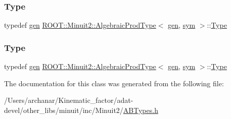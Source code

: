 \mbox{\label{classROOT_1_1Minuit2_1_1AlgebraicProdType_3_01gen_00_01sym_01_4_acdbf9062d11987f3a1cb857a95ef2669}} 
\subsubsection{\texorpdfstring{Type}{Type}\hspace{0.1cm}{\footnotesize\ttfamily [2/3]}}
{\footnotesize\ttfamily typedef \mbox{\hyperlink{classROOT_1_1Minuit2_1_1gen}{gen}} \mbox{\hyperlink{classROOT_1_1Minuit2_1_1AlgebraicProdType}{R\+O\+O\+T\+::\+Minuit2\+::\+Algebraic\+Prod\+Type}}$<$ \mbox{\hyperlink{classROOT_1_1Minuit2_1_1gen}{gen}}, \mbox{\hyperlink{classROOT_1_1Minuit2_1_1sym}{sym}} $>$\+::\mbox{\hyperlink{classROOT_1_1Minuit2_1_1AlgebraicProdType_3_01gen_00_01sym_01_4_acdbf9062d11987f3a1cb857a95ef2669}{Type}}}

\mbox{\label{classROOT_1_1Minuit2_1_1AlgebraicProdType_3_01gen_00_01sym_01_4_acdbf9062d11987f3a1cb857a95ef2669}} 
\subsubsection{\texorpdfstring{Type}{Type}\hspace{0.1cm}{\footnotesize\ttfamily [3/3]}}
{\footnotesize\ttfamily typedef \mbox{\hyperlink{classROOT_1_1Minuit2_1_1gen}{gen}} \mbox{\hyperlink{classROOT_1_1Minuit2_1_1AlgebraicProdType}{R\+O\+O\+T\+::\+Minuit2\+::\+Algebraic\+Prod\+Type}}$<$ \mbox{\hyperlink{classROOT_1_1Minuit2_1_1gen}{gen}}, \mbox{\hyperlink{classROOT_1_1Minuit2_1_1sym}{sym}} $>$\+::\mbox{\hyperlink{classROOT_1_1Minuit2_1_1AlgebraicProdType_3_01gen_00_01sym_01_4_acdbf9062d11987f3a1cb857a95ef2669}{Type}}}



The documentation for this class was generated from the following file\+:\begin{DoxyCompactItemize}
\item 
/\+Users/archanar/\+Kinematic\+\_\+factor/adat-\/devel/other\+\_\+libs/minuit/inc/\+Minuit2/\mbox{\hyperlink{adat-devel_2other__libs_2minuit_2inc_2Minuit2_2ABTypes_8h}{A\+B\+Types.\+h}}\end{DoxyCompactItemize}
